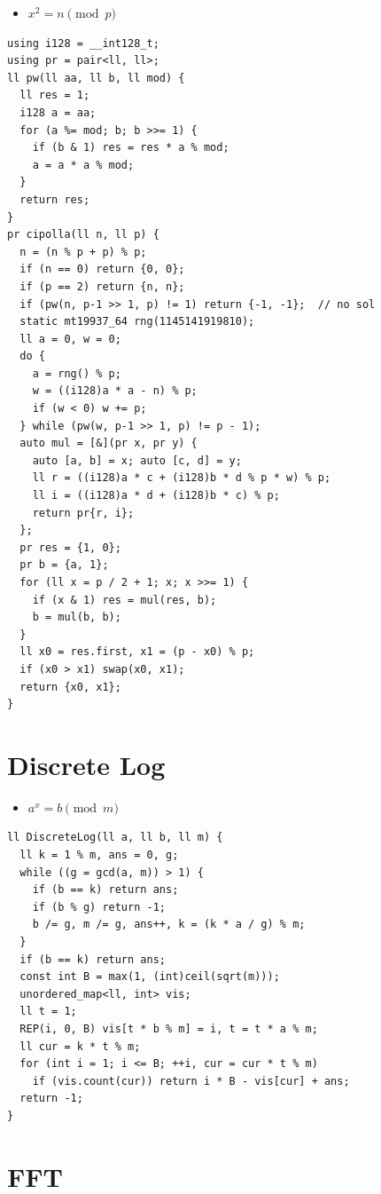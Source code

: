\documentclass[10pt, a4paper, twocolumn]{article}
\begin{document}
\begin{itemize}[tight_item]
  \item $x ^ 2 = n \pmod p$
\end{itemize}

\begin{verbatim}
using i128 = __int128_t;
using pr = pair<ll, ll>;
ll pw(ll aa, ll b, ll mod) {
  ll res = 1;
  i128 a = aa;
  for (a %= mod; b; b >>= 1) {
    if (b & 1) res = res * a % mod;
    a = a * a % mod;
  }
  return res;
}
pr cipolla(ll n, ll p) {
  n = (n % p + p) % p;
  if (n == 0) return {0, 0};
  if (p == 2) return {n, n};
  if (pw(n, p-1 >> 1, p) != 1) return {-1, -1};  // no sol
  static mt19937_64 rng(1145141919810);
  ll a = 0, w = 0;
  do {
    a = rng() % p;
    w = ((i128)a * a - n) % p;
    if (w < 0) w += p;
  } while (pw(w, p-1 >> 1, p) != p - 1);
  auto mul = [&](pr x, pr y) {
    auto [a, b] = x; auto [c, d] = y;
    ll r = ((i128)a * c + (i128)b * d % p * w) % p;
    ll i = ((i128)a * d + (i128)b * c) % p;
    return pr{r, i};
  };
  pr res = {1, 0};
  pr b = {a, 1};
  for (ll x = p / 2 + 1; x; x >>= 1) {
    if (x & 1) res = mul(res, b);
    b = mul(b, b);
  }
  ll x0 = res.first, x1 = (p - x0) % p;
  if (x0 > x1) swap(x0, x1);
  return {x0, x1};
}
\end{verbatim}

\newpage

\section{Discrete Log}

\begin{itemize}[tight_item]
  \item $a ^ x = b \pmod m$
\end{itemize}

\begin{verbatim}
ll DiscreteLog(ll a, ll b, ll m) {
  ll k = 1 % m, ans = 0, g;
  while ((g = gcd(a, m)) > 1) {
    if (b == k) return ans;
    if (b % g) return -1;
    b /= g, m /= g, ans++, k = (k * a / g) % m;
  }
  if (b == k) return ans;
  const int B = max(1, (int)ceil(sqrt(m)));
  unordered_map<ll, int> vis;
  ll t = 1;
  REP(i, 0, B) vis[t * b % m] = i, t = t * a % m;
  ll cur = k * t % m;
  for (int i = 1; i <= B; ++i, cur = cur * t % m)
    if (vis.count(cur)) return i * B - vis[cur] + ans;
  return -1;
}
\end{verbatim}

\section{FFT}
\end{document}
